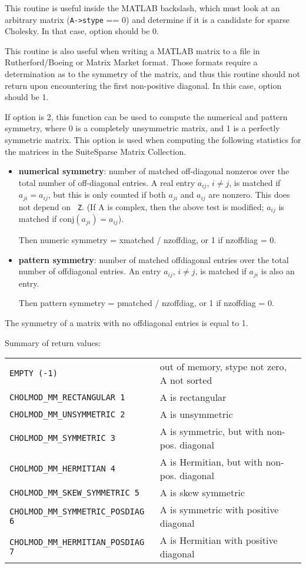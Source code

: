 \documentclass[11pt]{article}
\begin{document}
This routine is useful inside the MATLAB backslash, which must look at an
arbitrary matrix (\verb'A->stype' == 0) and determine if it is a candidate for
sparse Cholesky.  In that case, option should be 0.

This routine is also useful when writing a MATLAB matrix to a file in
Rutherford/Boeing or Matrix Market format.  Those formats require a
determination as to the symmetry of the matrix, and thus this routine should
not return upon encountering the first non-positive diagonal.  In this case,
option should be 1.

If option is 2, this function can be used to compute the numerical and
pattern symmetry, where 0 is a completely unsymmetric matrix, and 1 is a
perfectly symmetric matrix.  This option is used when computing the following
statistics for the matrices in the SuiteSparse Matrix Collection.

\begin{itemize}

    \item {\bf numerical symmetry}: number of matched off-diagonal nonzeros over
        the total number of off-diagonal entries.  A real entry $a_{ij}$,  $i
        \ne j$, is matched if $a_{ji} = a_{ij}$, but this is only counted if
        both $a_{ji}$ and $a_{ij}$ are nonzero.  This does not depend on {\tt
        Z}.  (If A is complex, then the above test is modified; $a_{ij}$ is
        matched if $\mbox{conj}(a_{ji}) = a_{ij}$).

        Then numeric symmetry = xmatched / nzoffdiag, or 1 if nzoffdiag = 0.

    \item {\bf pattern symmetry}: number of matched offdiagonal entries over
        the total number of offdiagonal entries.  An entry $a_{ij}$, $i \ne j$,
        is matched if $a_{ji}$ is also an entry.

        Then pattern symmetry = pmatched / nzoffdiag, or 1 if nzoffdiag = 0.
\end{itemize}

The symmetry of a matrix with no offdiagonal entries is equal to 1.

Summary of return values:

\begin{tabular}{ll}
{\tt EMPTY (-1)}                 & out of memory, stype not zero, A not sorted \\
{\tt CHOLMOD\_MM\_RECTANGULAR 1} & A is rectangular \\
{\tt CHOLMOD\_MM\_UNSYMMETRIC 2} & A is unsymmetric \\
{\tt CHOLMOD\_MM\_SYMMETRIC 3}   & A is symmetric, but with non-pos. diagonal \\
{\tt CHOLMOD\_MM\_HERMITIAN 4}   & A is Hermitian, but with non-pos. diagonal \\
{\tt CHOLMOD\_MM\_SKEW\_SYMMETRIC 5}    & A is skew symmetric \\
{\tt CHOLMOD\_MM\_SYMMETRIC\_POSDIAG 6} & A is symmetric with positive diagonal \\
{\tt CHOLMOD\_MM\_HERMITIAN\_POSDIAG 7} & A is Hermitian with positive diagonal \\
\end{tabular}
\end{document}
